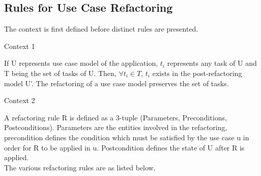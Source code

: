 \subsection{Rules for Use Case Refactoring}\label{section:selection_by_use_case/rules_for_use_case_refactoring}
The context is first defined before distinct rules are presented.
\\
\begin{shaded}Context 1 \end{shaded}
If U represents use case model of the application, $t_i$ represents any task of U and T being the set of tasks of U. Then, $\forall t_i \in T $, $t_i$ exists in the post-refactoring model U'. The refactoring of a use case model preserves the set of tasks.
\\
\begin{shaded}Context 2 \end{shaded}
A refactoring rule R is defined as a 3-tuple (Parameters, Preconditions, Postconditions). Parameters are the entities involved in the refactoring, precondition defines the condition which must be satisfied by the use case u in order for R to be applied in u. Postcondition defines the state of U after R is applied.
\\
The various refactoring rules are as listed below.
\\
